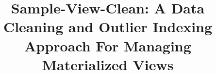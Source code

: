 \documentclass{sig-alternate}
\begin{document}
\newtheorem{theorem}{Theorem}
\newtheorem{example}{Example}
\newtheorem{definition}{Definition}
\newtheorem{proposition}{Proposition}
\newtheorem{lemma}{Lemma}
\newtheorem{corollary}{Corollary}

\newcommand{\cond}{\textrm{Cond}\xspace}
\newcommand{\dataset}{data set\xspace}
\newcommand{\datasets}{data sets\xspace}
\newcommand{\spview}{\textsf{SPView}\xspace}
\newcommand{\fjview}{\textsf{FJView}\xspace}
\newcommand{\aggview}{\textsf{AggView}\xspace}
\newcommand{\hashfunc}[1]{\textsf{hashfunc}(#1)\xspace}

\newcommand{\avgfunc}{\ensuremath{\texttt{avg} }\xspace}
\newcommand{\maxfunc}{\ensuremath{\texttt{max} }\xspace}
\newcommand{\countfunc}{\ensuremath{\texttt{count}}\xspace}
\newcommand{\sumfunc}{\ensuremath{\texttt{sum} }\xspace}
\newcommand{\havingfunc}{\ensuremath{\texttt{HAVING} }\xspace}
\newcommand{\ratio}{\ensuremath{\rho }\xspace}


\newcommand{\insertion}{\ensuremath{\texttt{INSERT} }\xspace}
\newcommand{\update}{\ensuremath{\texttt{UPDATE} }\xspace}
\newcommand{\delete}{\ensuremath{\texttt{DELETE} }\xspace}


\newcommand{\tbl}[1]{\textsf{#1}\xspace}
\newcommand{\field}[1]{\textsf{#1}\xspace}
\newcommand{\cost}{\textrm{cost}\xspace}
\newcommand{\ans}{\textsf{ans}\xspace}
\newcommand{\dans}{\Delta\textsf{ans}\xspace}
\newcommand{\cqp}{correcting query processing\xspace}
\newcommand{\Cqp}{Correcting query processing\xspace}

\newcommand{\reminder}[1]{{{\textcolor{magenta}{\{\{\bf #1\}\}}}\xspace}}
\newcommand{\specialcell}[2][c]{%
  \begin{tabular}[#1]{@{}c@{}}#2\end{tabular}}

\pagestyle{plain}

\title{Sample-View-Clean: A Data Cleaning and Outlier Indexing Approach For Managing Materialized Views}
\end{document}
